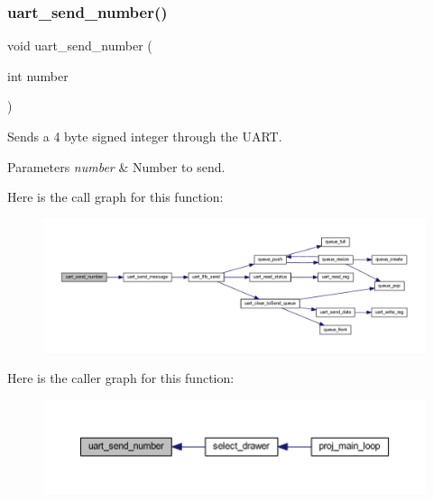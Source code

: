 \subsubsection{\texorpdfstring{uart\+\_\+send\+\_\+number()}{uart\_send\_number()}}
{\footnotesize\ttfamily void uart\+\_\+send\+\_\+number (\begin{DoxyParamCaption}\item[{int}]{number }\end{DoxyParamCaption})}



Sends a 4 byte signed integer through the U\+A\+RT. 


\begin{DoxyParams}{Parameters}
{\em number} & Number to send. \\
\hline
\end{DoxyParams}
Here is the call graph for this function\+:\nopagebreak
\begin{figure}[H]
\begin{center}
\leavevmode
\includegraphics[width=350pt]{group__uart__wordgame_ga2fc51e28d4b47e1ff96700527aea6ffd_cgraph}
\end{center}
\end{figure}
Here is the caller graph for this function\+:\nopagebreak
\begin{figure}[H]
\begin{center}
\leavevmode
\includegraphics[width=350pt]{group__uart__wordgame_ga2fc51e28d4b47e1ff96700527aea6ffd_icgraph}
\end{center}
\end{figure}
\mbox{\label{group__uart__wordgame_gaecefc87c97278f130cc9b72b8fa413c8}} 
